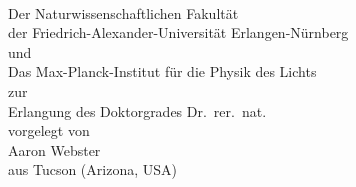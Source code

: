 \begin{titlepage}
  \begin{center}
    \hfill\\[2cm]
    {\Huge {\bfseries \textsc {\distitle}} \par}
    \vspace{11.0cm}
    {\large
      Der Naturwissenschaftlichen Fakultät\\
      der Friedrich-Alexander-Universität Erlangen-Nürnberg\\
      und\\
      Das Max-Planck-Institut für die Physik des Lichts\\
      \vspace{0.5cm}
      zur\\
      Erlangung des Doktorgrades Dr.\ rer.\ nat.\ \\
      \vspace{0.5cm}
      vorgelegt von\\
      Aaron Webster\\
      aus Tucson (Arizona, USA)
    }
  \end{center}
  \tikzexternaldisable{}
  \tikzexternalenable{}
\end{titlepage}

